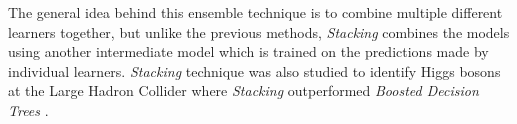 The general idea behind this ensemble technique is to combine multiple different learners together, but unlike the previous methods, \textit{Stacking} combines the models using another intermediate model which is trained on the predictions made by individual learners. \textit{Stacking} technique was also studied to identify Higgs bosons at the Large Hadron Collider where \textit{Stacking} outperformed \textit{Boosted Decision Trees} \citep{alves2017stacking}.  

